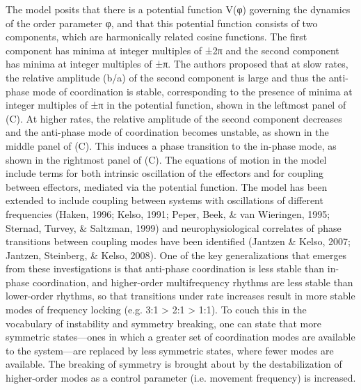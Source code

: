   The \citet{HakenEtAl1985} model posits that there is a potential function V(φ) governing the dynamics of the order parameter φ, and that this potential function consists of two components, which are harmonically related cosine functions. The first component has minima at integer multiples of ±2π and the second component has minima at integer multiples of ±π. The authors proposed that at slow rates, the relative amplitude (b/a) of the second component is large and thus the anti-phase mode of coordination is stable, corresponding to the presence of minima at integer multiples of ±π in the potential function, shown in the leftmost panel of (C). At higher rates, the relative amplitude of the second component decreases and the anti-phase mode of coordination becomes unstable, as shown in the middle panel of (C). This induces a phase transition to the in-phase mode, as shown in the rightmost panel of (C). The equations of motion in the model include terms for both intrinsic oscillation of the effectors and for coupling between effectors, mediated via the potential function. The model has been extended to include coupling between systems with oscillations of different frequencies (Haken, 1996; Kelso, 1991; Peper, Beek, \& van Wieringen, 1995; Sternad, Turvey, \& Saltzman, 1999) and neurophysiological correlates of phase transitions between coupling modes have been identified  (Jantzen \& Kelso, 2007; Jantzen, Steinberg, \& Kelso, 2008). One of the key generalizations that emerges from these investigations is that anti-phase coordination is less stable than in-phase coordination, and higher-order multifrequency rhythms are less stable than lower-order rhythms, so that transitions under rate increases result in more stable modes of frequency locking (e.g. 3:1 > 2:1 > 1:1). To couch this in the vocabulary of instability and symmetry breaking, one can state that more symmetric states—ones in which a greater set of coordination modes are available to the system—are replaced by less symmetric states, where fewer modes are available. The breaking of symmetry is brought about by the destabilization of higher-order modes as a control parameter (i.e. movement frequency) is increased.

